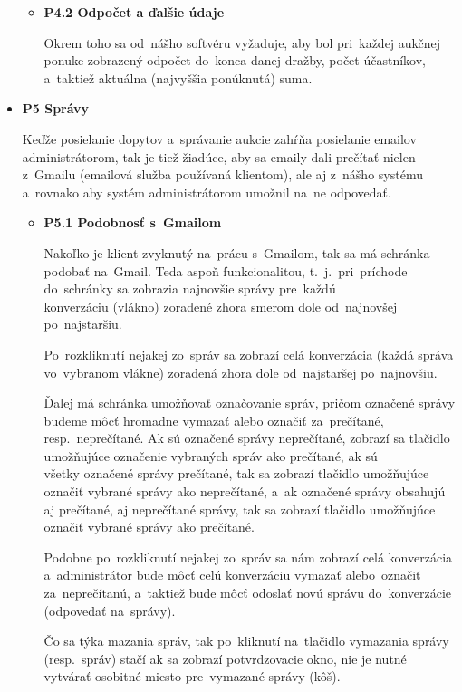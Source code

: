 \begin{itemize}
\begin{itemize}
\item \textbf{P4.2 Odpočet a ďalšie údaje}

Okrem toho sa od~nášho softvéru vyžaduje, aby bol pri~každej aukčnej ponuke zobrazený odpočet do~konca danej dražby, počet účastníkov, a~taktiež aktuálna (najvyššia ponúknutá) suma.
\end{itemize}

\item \textbf{P5 Správy}

Keďže posielanie dopytov a~správanie aukcie zahŕňa posielanie emailov administrátorom, tak je tiež žiadúce, aby sa emaily dali prečítať nielen\\z~Gmailu (emailová služba používaná klientom), ale aj z~nášho systému a~rovnako aby systém administrátorom umožnil na~ne odpovedať.

\begin{itemize}
\item \textbf{P5.1 Podobnosť s~Gmailom}

Nakoľko je klient zvyknutý na~prácu s~Gmailom, tak sa má schránka podobať na~Gmail. Teda aspoň funkcionalitou, t.~j.~pri~príchode\\do~schránky sa zobrazia najnovšie správy pre~každú\\konverzáciu (vlákno) zoradené zhora smerom dole od~najnovšej po~najstaršiu.

Po~rozkliknutí nejakej zo~správ sa zobrazí celá konverzácia (každá správa vo~vybranom vlákne) zoradená zhora dole od~najstaršej po~najnovšiu.

Ďalej má schránka umožňovať označovanie správ, pričom označené správy budeme môcť hromadne vymazať alebo označiť za~prečítané, resp.~neprečítané. Ak sú označené správy neprečítané, zobrazí sa tlačidlo umožňujúce označenie vybraných správ ako prečítané, ak sú\\všetky označené správy prečítané, tak sa zobrazí tlačidlo umožňujúce označiť vybrané správy ako neprečítané, a~ak označené správy obsahujú aj prečítané, aj neprečítané správy, tak sa zobrazí tlačidlo umožňujúce označiť vybrané správy ako prečítané.

Podobne po~rozkliknutí nejakej zo~správ sa nám zobrazí celá konverzácia a~administrátor bude môcť celú konverzáciu vymazať alebo~označiť za~neprečítanú, a~taktiež bude môcť odoslať novú správu do~konverzácie (odpovedať na~správy). 

Čo sa týka mazania správ, tak po~kliknutí na~tlačidlo vymazania správy (resp.~správ) stačí ak sa zobrazí potvrdzovacie okno, nie je nutné vytvárať osobitné miesto pre~vymazané správy (kôš). 


\end{itemize}
\end{itemize}
